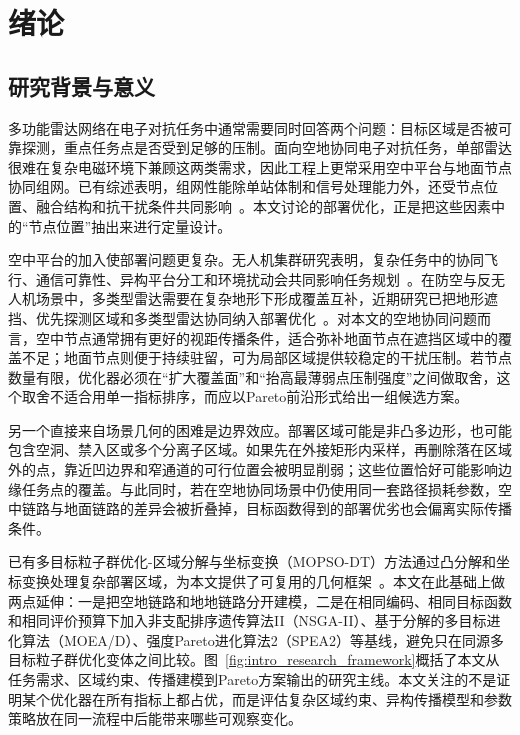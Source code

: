 \chapter{绪论}\label{chap:introduction}

\section{研究背景与意义}

多功能雷达网络在电子对抗任务中通常需要同时回答两个问题：目标区域是否被可靠探测，重点任务点是否受到足够的压制。面向空地协同电子对抗任务，单部雷达很难在复杂电磁环境下兼顾这两类需求，因此工程上更常采用空中平台与地面节点协同组网。已有综述表明，组网性能除单站体制和信号处理能力外，还受节点位置、融合结构和抗干扰条件共同影响~\cite{Javadi2020}。本文讨论的部署优化，正是把这些因素中的“节点位置”抽出来进行定量设计。

空中平台的加入使部署问题更复杂。无人机集群研究表明，复杂任务中的协同飞行、通信可靠性、异构平台分工和环境扰动会共同影响任务规划~\cite{Alqudsi2025UAVSwarms}。在防空与反无人机场景中，多类型雷达需要在复杂地形下形成覆盖互补，近期研究已把地形遮挡、优先探测区域和多类型雷达协同纳入部署优化~\cite{Ding2025UAVRadarDeployment}。对本文的空地协同问题而言，空中节点通常拥有更好的视距传播条件，适合弥补地面节点在遮挡区域中的覆盖不足；地面节点则便于持续驻留，可为局部区域提供较稳定的干扰压制。若节点数量有限，优化器必须在“扩大覆盖面”和“抬高最薄弱点压制强度”之间做取舍，这个取舍不适合用单一指标排序，而应以Pareto前沿形式给出一组候选方案。

另一个直接来自场景几何的困难是边界效应。部署区域可能是非凸多边形，也可能包含空洞、禁入区或多个分离子区域。如果先在外接矩形内采样，再删除落在区域外的点，靠近凹边界和窄通道的可行位置会被明显削弱；这些位置恰好可能影响边缘任务点的覆盖。与此同时，若在空地协同场景中仍使用同一套路径损耗参数，空中链路与地面链路的差异会被折叠掉，目标函数得到的部署优劣也会偏离实际传播条件。

已有多目标粒子群优化-区域分解与坐标变换（MOPSO-DT）方法通过凸分解和坐标变换处理复杂部署区域，为本文提供了可复用的几何框架~\cite{Han2025}。本文在此基础上做两点延伸：一是把空地链路和地地链路分开建模，二是在相同编码、相同目标函数和相同评价预算下加入非支配排序遗传算法II（NSGA-II）、基于分解的多目标进化算法（MOEA/D）、强度Pareto进化算法2（SPEA2）等基线，避免只在同源多目标粒子群优化变体之间比较。图~\ref{fig:intro_research_framework}概括了本文从任务需求、区域约束、传播建模到Pareto方案输出的研究主线。本文关注的不是证明某个优化器在所有指标上都占优，而是评估复杂区域约束、异构传播模型和参数策略放在同一流程中后能带来哪些可观察变化。

